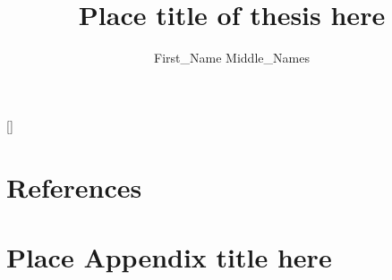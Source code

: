 \documentclass{thesisuni}
\title{Place title of thesis here}
\author{First_Name Middle_Names}{Last_Name}
\begin{document}

[\refname]{%
  \chapter*{References}%
  \markboth{}{}
}

\singlespacing
\printbibliography[heading=bibliography]
\forcepageno


\appendix

\doublespacing

\chapter{Place Appendix title here}
\label{Place name here for reference in document}
\forcepageno
\end{document}
